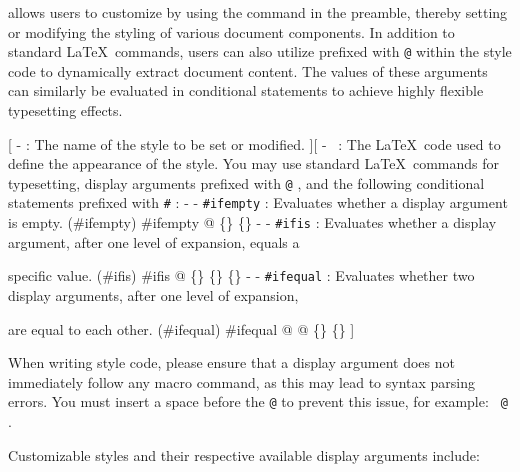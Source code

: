 
\SimpleSystemTeX allows users to customize  by using the  command in the preamble, thereby setting or modifying the styling of various document components. In addition to standard \LaTeX\ commands, users can also utilize  prefixed with \texttt{@} within the style code to dynamically extract document content. The values of these arguments can similarly be evaluated in conditional statements to achieve highly flexible typesetting effects.

[
    -  : The name of the style to be set or modified.
][
    - \longarg\ : The \LaTeX\ code used to define the appearance of the style. You may use standard \LaTeX\ commands for typesetting, display arguments prefixed with \texttt{@} , and the following conditional statements prefixed with \texttt{\#} :
        - - \texttt{\#ifempty} : Evaluates whether a display argument is empty.
        (\#ifempty){
            \upshape
            \#ifempty
            @
            \{\longarg\}
            \{\longarg\}
        }
        - - \texttt{\#ifis} : Evaluates whether a display argument, after one level of expansion, equals a
        \par\indent\indent\indent\indent specific value.
        (\#ifis){
            \upshape
            \#ifis
            @
            \{\}
            \{\longarg\}
            \{\longarg\}
        }
        - - \texttt{\#ifequal} : Evaluates whether two display arguments, after one level of expansion,
        \par\indent\indent\indent\indent\indent are equal to each other.
        (\#ifequal){
            \upshape
            \#ifequal
            @
            @
            \{\longarg\}
            \{\longarg\}
        }
]

When writing style code, please ensure that a display argument does not immediately follow any macro command, as this may lead to syntax parsing errors. You must insert a space before the \texttt{@} to prevent this issue, for example: \texttt{ @} .

\newpage Customizable styles and their respective available display arguments include:

